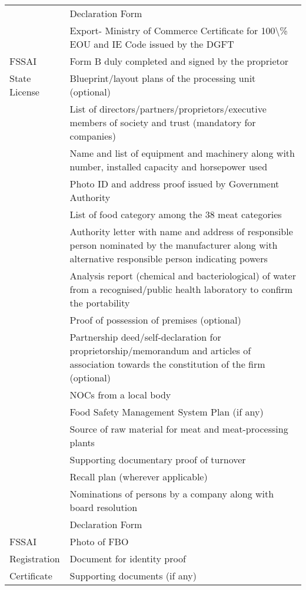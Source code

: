 \documentclass[a4paper, 12pt]{article}
\begin{document}
\begin{longtable}{>{\raggedright}p{2.5cm}>{\raggedright\arraybackslash}p{13cm}}
          & Declaration Form \\
          & Export- Ministry of Commerce Certificate for 100\textbackslash{}\% EOU and IE Code issued by the DGFT \\
    \midrule
    FSSAI & Form B duly completed and signed by the proprietor\\
    State License & Blueprint/layout plans of the processing unit (optional) \\
    & List of directors/partners/proprietors/executive members of society and trust (mandatory for companies) \\
          & Name and list of equipment and machinery along with number, installed capacity and horsepower used \\
          & Photo ID and address proof issued by Government Authority \\
          & List of food category among the 38 meat categories \\
          & Authority letter with name and address of responsible person nominated by the manufacturer along with alternative responsible person indicating powers   \\
          & Analysis report (chemical and bacteriological) of water from a recognised/public health laboratory to confirm the portability \\
          & Proof of possession of premises (optional) \\
          & Partnership deed/self-declaration for proprietorship/memorandum and articles of association towards the constitution of the firm (optional) \\
          & NOCs from a local body \\
          & Food Safety Management System Plan (if any) \\
          & Source of raw material for meat and meat-processing plants \\
          & Supporting documentary proof of turnover \\
          & Recall plan (wherever applicable) \\
          & Nominations of persons by a company along with board resolution \\
          & Declaration Form \\
    \midrule
    FSSAI & Photo of FBO \\
    Registration & Document for identity proof \\
    Certificate & Supporting documents (if any) \\
    \end{longtable}%
  \label{tab:addlabel}%
\end{document}
